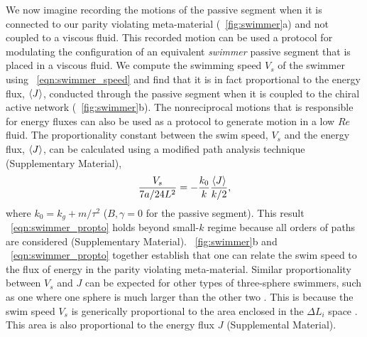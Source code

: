 \documentclass[
 preprint,
 preprintnumbers,
 amsmath,amssymb,
 aps,
 pre,
 longbibliography,
 superscriptaddress,
 10pt, twocolumn
]{revtex4-1}
\begin{document}

We now imagine recording the motions of the passive segment when it is connected to our parity violating meta-material (\figurename~\ref{fig:swimmer}a) and not coupled to a viscous fluid. This recorded motion can be used a protocol for modulating the configuration of an equivalent {\it swimmer} passive segment that is placed in a viscous fluid.
We compute the swimming speed $V_s$ of the swimmer using \eqnname~\ref{eqn:swimmer_speed} and find that it is in fact proportional to the energy flux, $\expval{J}$, conducted through the passive segment when it is coupled to the chiral active network (\figurename~\ref{fig:swimmer}b). The nonreciprocal motions that is responsible for energy fluxes can also be used as a protocol to generate motion in a low $Re$ fluid.
The proportionality constant between the swim speed, $V_s$ and the energy flux, $\expval{J}$, can be calculated using a modified path analysis technique (Supplementary Material),
\begin{equation} \label{eqn:swimmer_propto}
    \frac{V_s}{7a/24L^2} = -\frac{k_0}{k} \frac{\expval{J}}{k/2},
\end{equation}
where $k_0 = k_g + m/\tau^2$ ($B,\gamma=0$ for the passive segment).
This result \eqnname~\eqref{eqn:swimmer_propto} holds beyond small-$k$ regime because all orders of paths are considered (Supplementary Material).
\figurename~\ref{fig:swimmer}b and \eqnname~\eqref{eqn:swimmer_propto} together establish that one can relate the swim speed to the flux of energy in the parity violating meta-material. 
Similar proportionality between $V_s$ and $J$ can be expected for other types of three-sphere swimmers, such as one where one sphere is much larger than the other two \cite{Golestanian2008ThreesphereLowReynoldsnumber}. This is because the swim speed $V_s$ is generically proportional to the area enclosed in the $\Delta L_i$ space \cite{Golestanian2009StochasticLow}. This area is also proportional to the energy flux $J$ (Supplemental Material).
\end{document}
